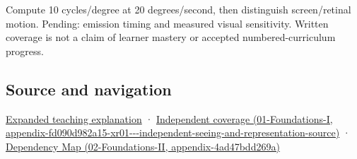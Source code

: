 Compute 10 cycles/degree at 20 degrees/second, then distinguish screen/retinal motion. Pending: emission timing and measured visual sensitivity. Written coverage is not a claim of learner mastery or accepted numbered-curriculum progress.

\subsection{Source and navigation}\label{appendix-70895739febb-source-and-navigation}

\hyperref[04-visual-computing-ii-ch042-a-gaze-sample-needs-a-time-as-well-as-a-direction]{Expanded teaching explanation} · \href{../01-Foundations-I/main.pdf\#nameddest=appendix-fd090d982a15-xr01---independent-seeing-and-representation-source}{Independent coverage (01-Foundations-I, appendix-fd090d982a15-xr01-\/-\/-independent-seeing-and-representation-source)} · \href{../02-Foundations-II/main.pdf\#nameddest=appendix-4ad47bdd269a}{Dependency Map (02-Foundations-II, appendix-4ad47bdd269a)}
